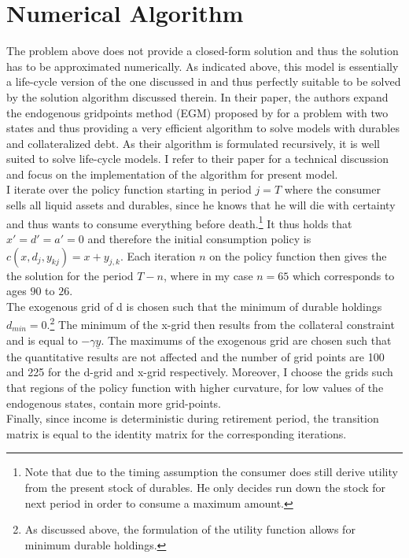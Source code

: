 \documentclass[a4paper,12pt,legno]{article}
\begin{document}
\section{Numerical Algorithm}

The problem above does not provide a closed-form solution and thus the solution has to be approximated numerically. As indicated above, this model is essentially a life-cycle version of the one discussed in \cite{hintermaier2010} and thus perfectly suitable to be solved by the solution algorithm discussed therein. In their paper, the authors expand the endogenous gridpoints method (EGM) proposed by \cite{carroll2006} for a problem with two states and thus providing a very efficient algorithm to solve models with durables and collateralized debt. As their algorithm is formulated recursively, it is well suited to solve life-cycle models. I refer to their paper for a technical discussion and focus on the implementation of the algorithm for present model.\\
I iterate over the policy function starting in period $j = T$ where the consumer sells all liquid assets and durables, since he knows that he will die with certainty and thus wants to consume everything before death.\footnote{Note that due to the timing assumption the consumer does still derive utility from the present stock of durables. He only decides run down the stock for next period in order to consume a maximum amount.} It thus holds that $x'=d'=a'=0$ and therefore the initial consumption policy is $c(x,d_{j},y_{kj})=x+y_{j,k}$. Each iteration $n$ on the policy function then gives the the solution for the period $T-n$, where in my case $n=65$ which corresponds to ages $90$ to $26$. \\
The exogenous grid of d is chosen such that the minimum of durable holdings $d_{min} = 0$.\footnote{As discussed above, the formulation of the utility function allows for minimum durable holdings.} The minimum of the x-grid then results from the collateral constraint and is equal to $-\gamma\underline{y}$. The maximums of the exogenous grid are chosen such that the quantitative results are not affected and the number of grid points are 100 and 225 for the d-grid and x-grid respectively. Moreover, I choose the grids such that regions of the policy function with higher curvature, for low values of the endogenous states, contain more grid-points.\\
Finally, since income is deterministic during retirement period, the transition matrix is equal to the identity matrix for the corresponding iterations.
\end{document}
